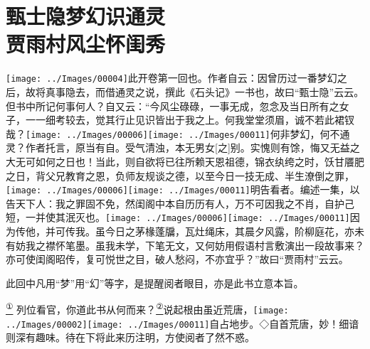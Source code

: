 
\chapter{甄士隐梦幻识通灵\\贾雨村风尘怀闺秀}

{\texttt{[image: ../Images/00004]}\kaishu 此开卷第一回也。作者自云：因曾历过一番梦幻之后，故将真事隐去，而借通灵之说，撰此《石头记》一书也，故曰``甄士隐''云云。但书中所记何事何人？自又云：``今风尘碌碌，一事无成，忽念及当日所有之女子，一一细考较去，觉其行止见识皆出于我之上。何我堂堂须眉，诚不若此裙钗哉？{\texttt{[image: ../Images/00006]}\texttt{[image: ../Images/00011]}\footnotesize \kaishu 何非梦幻，何不通灵？作者托言，原当有自。受气清浊，本无男女{[}之{]}别。}实愧则有馀，悔又无益之大无可如何之日也！当此，则自欲将已往所赖天恩祖德，锦衣纨绔之时，饫甘餍肥之日，背父兄教育之恩，负师友规谈之德，以至今日一技无成、半生潦倒之罪，{\texttt{[image: ../Images/00006]}\texttt{[image: ../Images/00011]}\footnotesize \kaishu 明告看者。}编述一集，以告天下人：我之罪固不免，然闺阁中本自历历有人，万不可因我之不肖，自护己短，一并使其泯灭也。{\texttt{[image: ../Images/00006]}\texttt{[image: ../Images/00011]}\footnotesize \kaishu 因为传他，并可传我。}虽今日之茅椽蓬牖，瓦灶绳床，其晨夕风露，阶柳庭花，亦未有妨我之襟怀笔墨。虽我未学，下笔无文，又何妨用假语村言敷演出一段故事来？亦可使闺阁昭传，复可悦世之目，破人愁闷，不亦宜乎？''故曰``贾雨村''云云。

此回中凡用``梦''用``幻''等字，是提醒阅者眼目，亦是此书立意本旨。}\href{../Text/part0005_split_000.html\#lnkback_1_a}{\textsuperscript{①}}
\yahei 列位看官，你道此书从何而来？\href{../Text/part0005_split_000.html\#lnkback_2_a}{\textsuperscript{②}}说起根由虽近荒唐，{\texttt{[image: ../Images/00002]}\texttt{[image: ../Images/00011]}\footnotesize \kaishu 自占地步。◇自首荒唐，妙！}细谙则深有趣味。待在下将此来历注明，方使阅者了然不惑。

